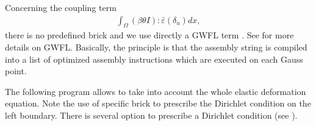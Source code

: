 \documentclass[a4paper,11pt,english]{sphinxmanual}
\begin{document}
Concerning the coupling term
\begin{equation*}
\begin{split}\int_{\Omega} (\beta\theta I) :\bar{\varepsilon}(\delta_u)dx,\end{split}
\end{equation*}
there is no predefined brick and we use directly a GWFL term . See  for more details on GWFL. Basically, the principle is that the assembly string is compiled into a list of optimized assembly instructions which are executed on each Gauss point.

The following program allows to take into account the whole elastic deformation equation. Note the use of specific brick to prescribe the Dirichlet condition on the left boundary. There is several option to prescribe a Dirichlet condition (see ).
\end{document}
